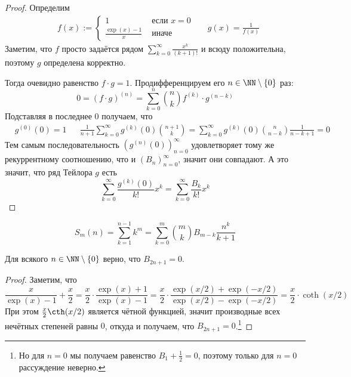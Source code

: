 \documentclass[12pt,a4paper]{article}
\begin{document}
    \begin{proof}
        Определим
        \begin{align*}
            &f(x) := \begin{cases}
                1& \text{ если $x = 0$}\\
                \frac{\exp(x) - 1}{x}& \text{ иначе}
            \end{cases}&
            &g(x) = \frac{1}{f(x)}
        \end{align*}
        Заметим, что $f$ просто задаётся рядом $\sum_{k=0}^\infty \frac{x^k}{(k+1)!}$ и всюду положительна, поэтому $g$ определена корректно.

        Тогда очевидно равенство $f \cdot g = 1$. Продифференцируем его $n \in \NN \setminus \{0\}$ раз:
        \[0 = (f \cdot g)^{(n)} = \sum_{k=0}^n \binom{n}{k} f^{(k)} \cdot g^{(n-k)}\]
        Подставляя в последнее $0$ получаем, что
        \begin{align*}
            &g^{(0)}(0) = 1&
            &\frac{1}{n+1}\sum_{k=0}^\infty g^{(k)}(0) \binom{n+1}{k} = \sum_{k=0}^\infty g^{(k)}(0) \binom{n}{n-k} \frac{1}{n-k+1} = 0
        \end{align*}
        Тем самым последовательность $(g^{(n)}(0))_{n=0}^\infty$ удовлетворяет тому же рекуррентному соотношению, что и $(B_n)_{n=0}^\infty$, значит они совпадают. А это значит, что ряд Тейлора $g$ есть
        \[\sum_{k=0}^\infty \frac{g^{(k)}(0)}{k!} x^k = \sum_{k=0}^\infty \frac{B_k}{k!} x^k\]
    \end{proof}

    \begin{statement}
        \[S_m(n) = \sum_{k=1}^{n-1} k^m = \sum_{k=0}^m \binom{m}{k} B_{m-k} \frac{n^k}{k+1}\]
    \end{statement}

    \begin{lemma}
        Для всякого $n \in \NN \setminus \{0\}$ верно, что $B_{2n+1} = 0$.
    \end{lemma}

    \begin{proof}
        Заметим, что
        \[\frac{x}{\exp(x) - 1} + \frac{x}{2} = \frac{x}{2} \cdot \frac{\exp(x) + 1}{\exp(x) - 1} = \frac{x}{2} \cdot \frac{\exp(x/2) + \exp(-x/2)}{\exp(x/2) - \exp(-x/2)} = \frac{x}{2} \cdot \coth(x/2)\]
        При этом $\frac{x}{2}\cth(x/2)$ является чётной функцией, значит производные всех нечётных степеней равны $0$, откуда и получаем, что $B_{2n+1} = 0$.\footnote{Но для $n = 0$ мы получаем равенство $B_1 + \frac{1}{2} = 0$, поэтому только для $n=0$ рассуждение неверно.}
    \end{proof}
\end{document}
